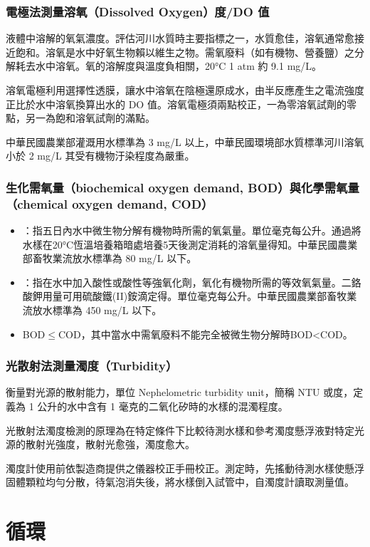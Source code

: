 \documentclass[a4paper,12pt]{report}
\begin{document}
\begin{itemize}
\subsubsection{電極法測量溶氧（Dissolved Oxygen）度/DO 值}
液體中溶解的氧氣濃度。評估河川水質時主要指標之一，水質愈佳，溶氧通常愈接近飽和。溶氧是水中好氧生物賴以維生之物。需氧廢料（如有機物、營養鹽）之分解耗去水中溶氧。氧的溶解度與溫度負相關，20°C 1 atm 約 9.1 mg/L。

溶氧電極利用選擇性透膜，讓水中溶氧在陰極還原成水，由半反應產生之電流強度正比於水中溶氧換算出水的 DO 值。溶氧電極須兩點校正，一為零溶氧試劑的零點，另一為飽和溶氧試劑的滿點。

中華民國農業部灌溉用水標準為 3 mg/L 以上，中華民國環境部水質標準河川溶氧小於 2 mg/L 其受有機物汙染程度為嚴重。
\subsubsection{生化需氧量（biochemical oxygen demand, BOD）與化學需氧量（chemical oxygen demand, COD）}
\begin{itemize}
    \item {}：指五日內水中微生物分解有機物時所需的氧氣量。單位毫克每公升。通過將水樣在20°C恆溫培養箱暗處培養5天後測定消耗的溶氧量得知。中華民國農業部畜牧業流放水標準為 80 mg/L 以下。
    \item {}：指在水中加入酸性或酸性等強氧化劑，氧化有機物所需的等效氧氣量。二鉻酸鉀用量可用硫酸鐵(II)銨滴定得。單位毫克每公升。中華民國農業部畜牧業流放水標準為 450 mg/L 以下。
    \item BOD$\leq$COD，其中當水中需氧廢料不能完全被微生物分解時BOD<COD。
\end{itemize}
\subsubsection{光散射法測量濁度（Turbidity）}
衡量對光源的散射能力，單位 Nephelometric turbidity unit，簡稱 NTU 或度，定義為 1 公升的水中含有 1 毫克的二氧化矽時的水樣的混濁程度。

光散射法濁度檢測的原理為在特定條件下比較待測水樣和參考濁度懸浮液對特定光源的散射光強度，散射光愈強，濁度愈大。

濁度計使用前依製造商提供之儀器校正手冊校正。測定時，先搖動待測水樣使懸浮固體顆粒均勻分散，待氣泡消失後，將水樣倒入試管中，自濁度計讀取測量值。


\section{循環}

\end{itemize}
\end{document}
